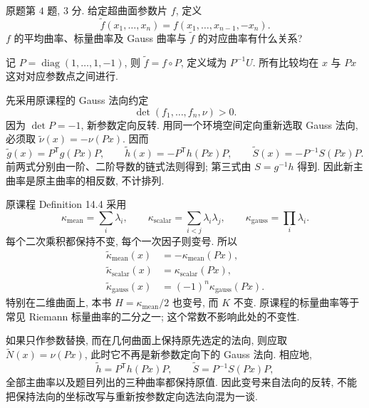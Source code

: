\begin{exercise}\label{ps:6-4}
原题第 $4$ 题, $3$ 分. 给定超曲面参数片 $f$, 定义
\[
 \widetilde f(x_1,\ldots,x_n)=f(x_1,\ldots,x_{n-1},-x_n).
\]
$f$ 的平均曲率、标量曲率及 Gauss 曲率与 $\widetilde f$ 的对应曲率有什么关系?
\end{exercise}
\begin{solution}
记 $P=\operatorname{diag}(1,\ldots,1,-1)$, 则 $\widetilde f=f\circ P$, 定义域为 $P^{-1}U$. 所有比较均在 $x$ 与 $Px$ 这对对应参数点之间进行.

先采用原课程的 Gauss 法向约定
\[
 \det(f_1,\ldots,f_n,\nu)>0.
\]
因为 $\det P=-1$, 新参数定向反转. 用同一个环境空间定向重新选取 Gauss 法向, 必须取 $\widetilde\nu(x)=-\nu(Px)$. 因而
\[
 \widetilde g(x)=P^{\mathsf T}g(Px)P,\qquad
 \widetilde h(x)=-P^{\mathsf T}h(Px)P,\qquad
 \widetilde S(x)=-P^{-1}S(Px)P.
\]
前两式分别由一阶、二阶导数的链式法则得到; 第三式由 $S=g^{-1}h$ 得到. 因此新主曲率是原主曲率的相反数, 不计排列.

原课程 Definition 14.4 采用
\[
 \kappa_{\mathrm{mean}}=\sum_i\lambda_i,\qquad
 \kappa_{\mathrm{scalar}}=\sum_{i<j}\lambda_i\lambda_j,\qquad
 \kappa_{\mathrm{gauss}}=\prod_i\lambda_i.
\]
每个二次乘积都保持不变, 每个一次因子则变号. 所以
\[
 \begin{aligned}
 \widetilde\kappa_{\mathrm{mean}}(x)&=-\kappa_{\mathrm{mean}}(Px),\\
 \widetilde\kappa_{\mathrm{scalar}}(x)&=\kappa_{\mathrm{scalar}}(Px),\\
 \widetilde\kappa_{\mathrm{gauss}}(x)&=(-1)^n\kappa_{\mathrm{gauss}}(Px).
 \end{aligned}
\]
特别在二维曲面上, 本书 $H=\kappa_{\mathrm{mean}}/2$ 也变号, 而 $K$ 不变. 原课程的标量曲率等于常见 Riemann 标量曲率的二分之一; 这个常数不影响此处的不变性.

如果只作参数替换, 而在几何曲面上保持原先选定的法向, 则应取 $\widetilde N(x)=\nu(Px)$, 此时它不再是新参数定向下的 Gauss 法向. 相应地,
\[
 \widetilde h=P^{\mathsf T}h(Px)P,\qquad
 \widetilde S=P^{-1}S(Px)P,
\]
全部主曲率以及题目列出的三种曲率都保持原值. 因此变号来自法向的反转, 不能把保持法向的坐标改写与重新按参数定向选法向混为一谈.
\end{solution}
